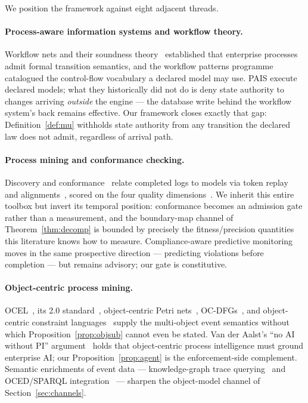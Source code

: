 We position the framework against eight adjacent threads.

\paragraph{Process-aware information systems and workflow theory.}
Workflow nets and their soundness
theory~\cite{van_der_aalst_wfnet_soundness_1997,desel_esparza_free_choice_1995}
established that enterprise processes admit formal transition semantics, and
the workflow patterns programme~\cite{russell_workflow_patterns_2015}
catalogued the control-flow vocabulary a declared model may use. PAIS execute
declared models; what they historically did not do is deny state authority to
changes arriving \emph{outside} the engine --- the database write behind the
workflow system's back remains effective. Our framework closes exactly that
gap: Definition~\ref{def:mu} withholds state authority from any transition the
declared law does not admit, regardless of arrival path.

\paragraph{Process mining and conformance checking.}
Discovery and conformance~\cite{van_der_aalst_process_mining_2011,van_der_aalst_2016_process_mining,van_der_aalst_conformance_checking_2018}
relate completed logs to models via token replay~\cite{rozinat_van_der_aalst_2008}
and alignments~\cite{adriansyah_et_al_alignments_2011,adriansyah_2014_phd},
scored on the four quality
dimensions~\cite{buijs_et_al_quality_dimensions_2012}. We inherit this entire
toolbox but invert its temporal position: conformance becomes an admission
gate rather than a measurement, and the boundary-map channel of
Theorem~\ref{thm:decomp} is bounded by precisely the fitness/precision
quantities this literature knows how to measure. Compliance-aware predictive
monitoring~\cite{de_santis_compliance_predictive_2024} moves in the same
prospective direction --- predicting violations before completion --- but
remains advisory; our gate is constitutive.

\paragraph{Object-centric process mining.}
OCEL~\cite{ghahfarokhi_et_al_ocel_2021}, its 2.0
standard~\cite{berti_et_al_ocel2_spec_2024,ocel_2_standard_2023},
object-centric Petri nets~\cite{van_der_aalst_berti_2020}, OC-DFGs~\cite{berti_van_der_aalst_oc_dfg_2023},
and object-centric constraint
languages~\cite{kuesters_van_der_aalst_ocpq_2025,kuesters_van_der_aalst_oc_declare_2025}
supply the multi-object event semantics without which
Proposition~\ref{prop:objsub} cannot even be stated. Van der Aalst's
``no AI without PI'' argument~\cite{van_der_aalst_no_ai_without_pi_2024}
holds that object-centric process intelligence must ground enterprise AI;
our Proposition~\ref{prop:agent} is the enforcement-side complement.
Semantic enrichments of event data --- knowledge-graph trace
querying~\cite{process_trace_kg_2024} and OCED/SPARQL
integration~\cite{ocel_xes_sparql_2024} --- sharpen the object-model channel
of Section~\ref{sec:channels}.

